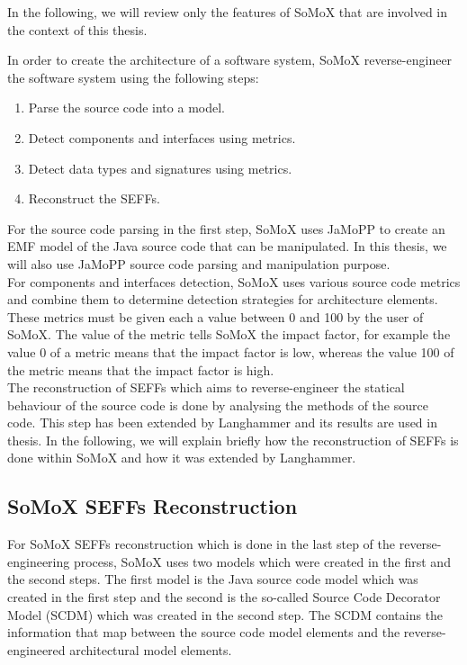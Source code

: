 In the following, we will review only the features of SoMoX that are involved in the context of this thesis. 

In order to create the architecture of a software system, SoMoX reverse-engineer the software system using the following steps:
\begin{enumerate}
\item Parse the source code into a model.  
\item Detect components and interfaces using metrics.
\item Detect data types and signatures using metrics.
\item Reconstruct the SEFFs.
\end{enumerate}

For the source code parsing in the first step, SoMoX uses JaMoPP to create an EMF model of the Java source code that can be manipulated. In this thesis, we will also use JaMoPP source code parsing and manipulation purpose.\\

For components and interfaces detection, SoMoX uses various source code metrics and combine them to determine detection strategies for architecture elements. These metrics must be given each a value between 0 and 100 by the user of SoMoX. The value of the metric tells SoMoX the impact factor, for example the value 0 of a metric means that the impact factor is low, whereas the value 100 of the metric means that the impact factor is high. \\

The reconstruction of SEFFs which aims to reverse-engineer the statical behaviour of the source code is done by analysing the methods of the source code. This step has been extended by Langhammer \cite{langhammer2017automated} and its results are used in thesis. In the following, we will explain briefly how the reconstruction of SEFFs is done within SoMoX and how it was extended by Langhammer.\\

\subsection{SoMoX SEFFs Reconstruction}  
\label{sec:SoMoX SEFFs Reconstruction}
For SoMoX SEFFs reconstruction which is done in the last step of the reverse-engineering process, SoMoX uses two models which were created in the first and the second steps. The first model is the Java source code model which was created in the first step and the second is the so-called Source Code Decorator Model (SCDM) which was created in the second step. The SCDM contains the information that map between the source code model elements and the reverse-engineered architectural model elements.\\

